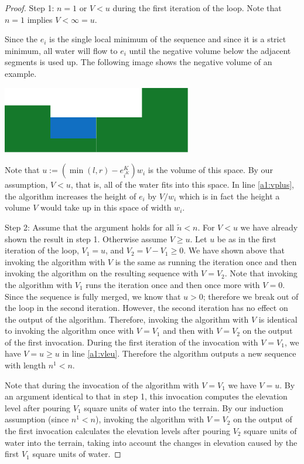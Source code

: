\documentclass[11pt,a4paper]{article}
\begin{document}
\begin{proof}
Step 1: $n = 1$ or $V < u$ during the first iteration of the loop. Note that $n = 1$ implies $V < \infty = u$.

Since the $e_i$ is the single local minimum of the sequence and since it is a strict minimum, all water will flow to $e_i$ until the negative volume below the adjacent segments is used up.
The following image shows the negative volume of an example.
\begin{center}
  \includegraphics{im6.pdf}
\end{center}
Note that $u := (\min(l, r)-e_{i^K}^K)w_i$ is the volume of this space.
By our assumption, $V < u$, that is, all of the water fits into this space.
In line \ref{a1:vplus}, the algorithm increases the height of $e_i$ by $V/w_i$ which is in fact the height a volume $V$ would take up in this space of width $w_i$.

Step 2: Assume that the argument holds for all $\tilde{n} < n$.
For $V < u$ we have already shown the result in step 1.
Otherwise assume $V \ge u$.
Let $u$ be as in the first iteration of the loop, $V_1 = u$, and $V_2 = V - V_1 \ge 0$.
We have shown above that invoking the algorithm with $V$ is the same as running the iteration once and then invoking the algorithm on the resulting sequence with $V = V_2$.
Note that invoking the algorithm with $V_1$ runs the iteration once and then once more with $V = 0$.
Since the sequence is fully merged, we know that $u > 0$; therefore we break out of the loop in the second iteration.
However, the second iteration has no effect on the output of the algorithm.
Therefore, invoking the algorithm with $V$ is identical to invoking the algorithm once with $V = V_1$ and then with $V = V_2$ on the output of the first invocation.
During the first iteration of the invocation with $V = V_1$, we have $V = u \ge u$ in line \ref{a1:vleu}.
Therefore the algorithm outputs a new sequence with length $n^1 < n$.

Note that during the invocation of the algorithm with $V = V_1$ we have $V = u$.
By an argument identical to that in step 1, this invocation computes the elevation level after pouring $V_1$ square units of water into the terrain.
By our induction assumption (since $n^1 < n$), invoking the algorithm with $V = V_2$ on the output of the first invocation calculates the elevation levels after pouring $V_2$ square units of water into the terrain, taking into account the changes in elevation caused by the first $V_1$ square units of water.


\end{proof}
\end{document}
